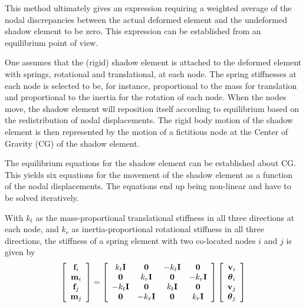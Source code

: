 This method ultimately gives an expression requiring a weighted average of the
nodal discrepancies between the actual deformed element and the undeformed
shadow element to be zero.
This expression can be established from an equilibrium point of view.

One assumes that the (rigid) shadow element is attached to the deformed element
with springs, rotational and translational, at each node.
The spring stiffnesses at each node is selected to be, for instance,
proportional to the mass for translation and proportional to the inertia for
the rotation of each node.
When the nodes move, the shadow element will reposition itself according to
equilibrium based on the redistribution of nodal displacements.
The rigid body motion of the shadow element is then represented by the motion of
a fictitious node at the Center of Gravity (CG) of the shadow element.

The equilibrium equations for the shadow element can be established about CG.
This yields six equations for the movement of the shadow element as a function
of the nodal displacements.
The equations end up being non-linear and have to be solved iteratively.

With $k_t$ as the mass-proportional translational stiffness in all three
directions at each node, and $k_r$ as inertia-proportional rotational
stiffness in all three directions, the stiffness of a spring element
with two co-located nodes $i$ and $j$ is given by
%
\begin{equation}
\left[\begin{array}{c}
{\bf f}_i \\ {\bf m}_i \\ {\bf f}_j \\ {\bf m}_j \\
\end{array}
\right]
=\left[\begin{array}{cccc}
 k_t {\bf I}  & {\bf 0}  & -k_t {\bf I}  & {\bf 0} \\
 {\bf 0} &  k_r {\bf I}  & {\bf 0} &  -k_r {\bf I} \\
 -k_t {\bf I}  & {\bf 0}  & k_t {\bf I}  & {\bf 0} \\
 {\bf 0} &  -k_r {\bf I}  & {\bf 0} &  k_r {\bf I} \\
\end{array}\right]
\left[\begin{array}{c}
{\bf v}_i \\ {\boldsymbol{\theta}}_i \\ {\bf v}_j \\ {\boldsymbol{\theta}}_j \end{array}\right]
\label{eqCS2_nodeStiff}
\end{equation}

